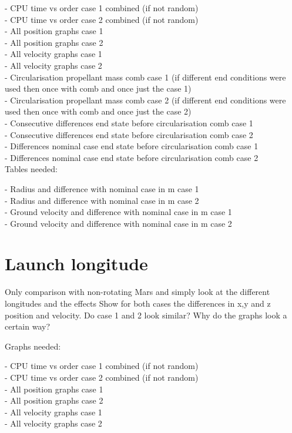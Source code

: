 - CPU time vs order case 1 combined (if not random) \\
- CPU time vs order case 2 combined (if not random) \\
- All position graphs case 1 \\
- All position graphs case 2 \\
- All velocity graphs case 1 \\
- All velocity graphs case 2 \\

- Circularisation propellant mass comb case 1 (if different end conditions were used then once with comb and once just the case 1) \\
- Circularisation propellant mass comb case 2 (if different end conditions were used then once with comb and once just the case 2) \\
- Consecutive differences end state before circularisation comb case 1 \\
- Consecutive differences end state before circularisation comb case 2 \\
- Differences nominal case end state before circularisation comb case 1 \\
- Differences nominal case end state before circularisation comb case 2 \\


Tables needed:

- Radius and difference with nominal case in m case 1 \\
- Radius and difference with nominal case in m case 2 \\
- Ground velocity and difference with nominal case in m case 1 \\
- Ground velocity and difference with nominal case in m case 2 \\
 


\section{Launch longitude}
\label{sec:launchLongitude}

Only comparison with non-rotating Mars and simply look at the different longitudes and the effects
Show for both cases the differences in x,y and z position and velocity. Do case 1 and 2 look similar? Why do the graphs look a certain way?

Graphs needed:

- CPU time vs order case 1 combined (if not random) \\
- CPU time vs order case 2 combined (if not random) \\
- All position graphs case 1 \\
- All position graphs case 2 \\
- All velocity graphs case 1 \\
- All velocity graphs case 2 \\

